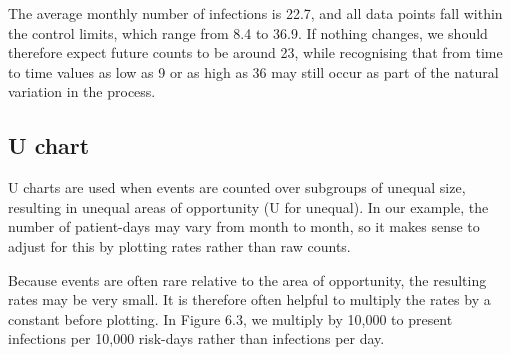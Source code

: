\documentclass[
]{book}
\begin{document}
The average monthly number of infections is 22.7, and all data points fall within the control limits, which range from 8.4 to 36.9. If nothing changes, we should therefore expect future counts to be around 23, while recognising that from time to time values as low as 9 or as high as 36 may still occur as part of the natural variation in the process.

\subsection{U chart}\label{u-chart}

U charts are used when events are counted over subgroups of unequal size, resulting in unequal areas of opportunity (U for unequal). In our example, the number of patient-days may vary from month to month, so it makes sense to adjust for this by plotting rates rather than raw counts.

Because events are often rare relative to the area of opportunity, the resulting rates may be very small. It is therefore often helpful to multiply the rates by a constant before plotting. In Figure 6.3, we multiply by 10,000 to present infections per 10,000 risk-days rather than infections per day.
\end{document}
